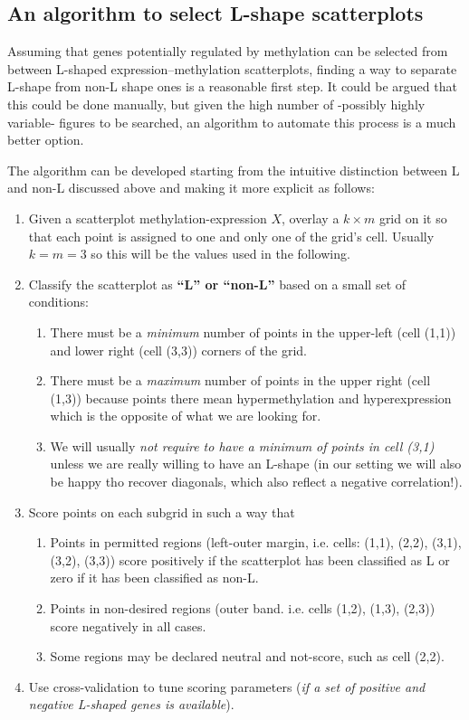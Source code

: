 \documentclass[10pt,letterpaper]{article}
\begin{document}
\hypertarget{an-algorithm-to-select-l-shape-scatterplots}{%
\subsection{An algorithm to select L-shape
scatterplots}\label{an-algorithm-to-select-l-shape-scatterplots}}

Assuming that genes potentially regulated by methylation can be selected
from between L-shaped expression--methylation scatterplots, finding a
way to separate L-shape from non-L shape ones is a reasonable first
step. It could be argued that this could be done manually, but given the
high number of -possibly highly variable- figures to be searched, an
algorithm to automate this process is a much better option.

The algorithm can be developed starting from the intuitive distinction
between L and non-L discussed above and making it more explicit as
follows:

\begin{enumerate}
\item Given a scatterplot methylation-expression $X$, overlay a $k\times m$ grid on it so that each point is assigned to one and only one of the grid's cell. Usually $k=m=3$ so this will be the values used in the following.
\item Classify the scatterplot as \textbf{``L'' or ``non-L''} based on a small set of conditions:
\begin{enumerate}
  \item There must be a \emph{minimum} number of points in the upper-left (cell (1,1)) and lower right (cell (3,3)) corners of the grid.
  \item There must be a \emph{maximum} number of points in the upper right (cell (1,3)) because points there mean hypermethylation and hyperexpression which is the opposite of what we are looking for.
  \item We will usually \emph{not require to have a minimum of points in cell (3,1)} unless we are really willing to have an L-shape (in our setting we will also be happy tho recover diagonals, which also reflect a negative correlation!).
\end{enumerate}
\item Score points on each subgrid in such a way that
\begin{enumerate}
    \item Points in permitted regions (left-outer margin, i.e. cells: (1,1), (2,2), (3,1), (3,2), (3,3)) score positively if the scatterplot has been classified as L or zero if it has been classified as non-L.
    \item Points in non-desired regions (outer band. i.e. cells (1,2), (1,3), (2,3)) score negatively in all cases.
    \item Some regions may be declared neutral and not-score, such as cell (2,2).
\end{enumerate}
\item Use cross-validation to tune scoring parameters (\textit{if a set of positive and negative L-shaped genes is available}). 
\end{enumerate}
\end{document}

